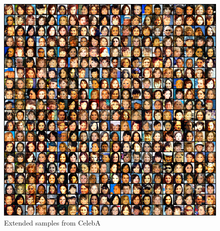 \documentclass{article}
\begin{document}
\begin{figure}[h!]
    \centering
    \includegraphics[width=\linewidth]{figures/samples/celeba_samples_large.png}
    \caption{Extended samples from CelebA}
    \label{fig:celeba-samples-large}
\end{figure}
\end{document}
